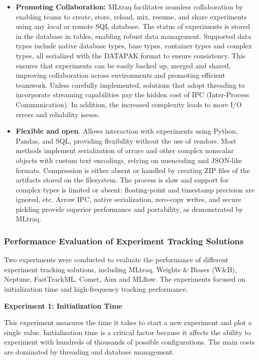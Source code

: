 \begin{itemize}
    \item \textbf{Promoting Collaboration:} MLtraq facilitates seamless collaboration by enabling teams to create, store, reload, mix, resume, and share experiments using any local or remote SQL database. The status of experiments is stored in the database in tables, enabling robust data management. Supported data types include native database types, base types, container types and complex types, all serialized with the DATAPAK format to ensure consistency. This ensures that experiments can be easily backed up, merged and shared, improving collaboration across environments and promoting efficient teamwork. Unless carefully implemented, solutions that adopt threading to incorporate streaming capabilities pay the hidden cost of IPC (Inter-Process Communication). In addition, the increased complexity leads to more I/O errors and reliability issues.
    \item \textbf{Flexible and open}. Allows interaction with experiments using Python, Pandas, and SQL, providing flexibility without the use of vendors. Most methods implement serialization of arrays and other complex nonscalar objects with custom text encodings, relying on uuencoding and JSON-like formats. Compression is either absent or handled by creating ZIP files of the artifacts stored on the filesystem. The process is slow and support for complex types is limited or absent: floating-point and timestamp precision are ignored, etc. Arrow IPC, native serialization, zero-copy writes, and secure pickling provide superior performance and portability, as demonstrated by MLtraq. \cite{mltraq2024}
\end{itemize}

\subsubsection{Performance Evaluation of Experiment Tracking Solutions}

Two experiments were conducted to evaluate the performance of different experiment tracking solutions, including MLtraq, Weights \& Biases (W\&B), Neptune, FastTrackML, Comet, Aim and MLflow. The experiments focused on initialization time and high-frequency tracking performance. \newline

\textbf{Experiment 1: Initialization Time}

This experiment measures the time it takes to start a new experiment and plot a single value. Initialization time is a critical factor because it affects the ability to experiment with hundreds of thousands of possible configurations. The main costs are dominated by threading and database management.

